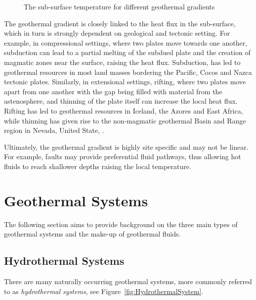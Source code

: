     \begin{figure}[H]
        \centering
        
        \caption{The sub-surface temperature for different geothermal gradients}
        \label{fig:GeothermalGradient}
    \end{figure}

    The geothermal gradient is closely linked to the heat flux in the sub-surface, which in turn is strongly dependent on geological and tectonic setting. For example, in compressional settings, where two plates move towards one another, subduction can lead to a partial melting of the subdued plate and the creation of magmatic zones near the surface, raising the heat flux. Subduction, has led to geothermal resources in most land masses bordering the Pacific, Cocos and Nazca tectonic plates. Similarly, in extensional settings, rifting, where two plates move apart from one another with the gap being filled with material from the astenosphere, and thinning of the plate itself can increase the local heat flux. Rifting has led to geothermal resources in Iceland, the Azores and East Africa, while thinning has given rise to the non-magmatic geothermal Basin and Range region in Nevada, United State, \cite{DiPippo2016}.

    Ultimately, the geothermal gradient is highly site specific and may not be linear. For example, faults may provide preferential fluid pathways, thus allowing hot fluids to reach shallower depths raising the local temperature.  

\section{Geothermal Systems}
\label{sec:geothermal_systems}
    The following section aims to provide background on the three main types of geothermal systems and the make-up of geothermal fluids.

    \subsection{Hydrothermal Systems}
    \label{sec:hydrothermal_system}
    There are many naturally occurring geothermal systems, more commonly referred to as \emph{hydrothermal systems}, see Figure~\ref{fig:HydrothermalSystem}. 
    
